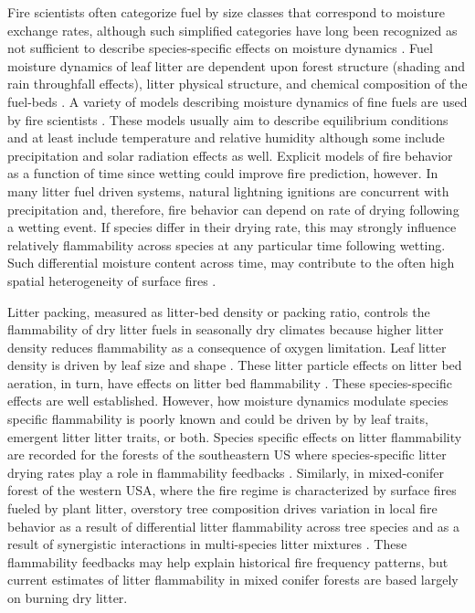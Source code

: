 \documentclass[letterpaper,12pt]{article}
\begin{document}
Fire scientists often categorize fuel by size classes that correspond to
moisture exchange rates, although such simplified categories have long been
recognized as not sufficient to describe species-specific effects on moisture
dynamics \citep{Anderson-1985}. Fuel moisture dynamics of leaf litter are
dependent upon forest structure (shading and rain throughfall effects), litter
physical structure, and chemical composition of the fuel-beds
\citep{Nelson+Hiers-2008, Matthews-2014, Kreye_Hiers_etal-2018}. A variety of
models describing moisture dynamics of fine fuels are used by fire scientists
\citep{Viney-1991, Nelson-2000, Catchpole+Catchpole+etal-2001}. These models
usually aim to describe equilibrium conditions and at least include temperature
and relative humidity although some include precipitation and solar radiation
effects as well. Explicit models of fire behavior as a function of time since
wetting could improve fire prediction, however. In many litter fuel driven
systems, natural lightning ignitions are concurrent with precipitation and,
therefore, fire behavior can depend on rate of drying following a wetting
event. If species differ in their drying rate, this may strongly influence
relatively flammability across species at any particular time following
wetting. Such differential moisture content across time, may contribute to the
often high spatial heterogeneity of surface fires
\citep{Knapp_Schwilk_etal-2006, Kreye_Hiers_etal-2018}.

Litter packing, measured as litter-bed density or packing ratio, controls the
flammability of dry litter fuels in seasonally dry climates because higher
litter density reduces flammability as a consequence of oxygen limitation. Leaf
litter density is driven by leaf size and shape
\citep{Fonda+Belanger+etal-1998, Scarff+Westoby-2006, Kane+Varner+etal-2008}.
These litter particle effects on litter bed aeration, in turn, have effects on
litter bed flammability \citep{Ganteaume+Marielle+etal-2011,
  Schwilk+Caprio-2011, Kreye+Varner+etal-2013}. These species-specific effects
are well established. However, how moisture dynamics modulate species specific
flammability is poorly known and could be driven by by leaf traits, emergent
litter litter traits, or both. Species specific effects on litter flammability
are recorded for the forests of the southeastern US \citep{Nowacki+Abrams-2008}
where species-specific litter drying rates play a role in flammability
feedbacks \citep{Kreye+Varner+etal-2013}. Similarly, in mixed-conifer forest of
the western USA, where the fire regime is characterized by surface fires fueled
by plant litter, overstory tree composition drives variation in local fire
behavior \citep{Schwilk+Caprio-2011} as a result of differential litter
flammability across tree species and as a result of synergistic interactions in
multi-species litter mixtures \citep{Magalhaes+Schwilk-2012}. These
flammability feedbacks may help explain historical fire frequency patterns, but
current estimates of litter flammability in mixed conifer forests are based
largely on burning dry litter.
\end{document}
